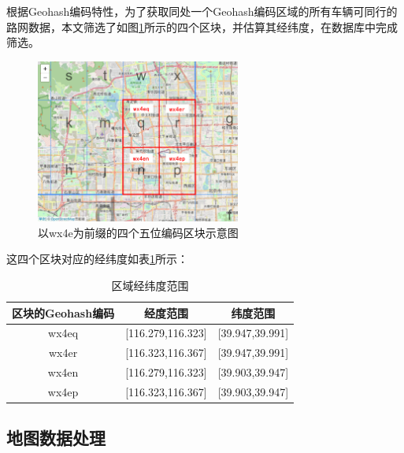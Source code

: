 根据Geohash编码特性，为了获取同处一个Geohash编码区域的所有车辆可同行的路网数据，本文筛选了如图\ref{mapDataRegion-big}所示的四个区块，并估算其经纬度，在数据库中完成筛选。

\begin{figure}[ht]
    \centering
    \includegraphics[width=0.6\textwidth]{undergraduate-thesis/images/FourRegions.png}
    \caption{以wx4e为前缀的四个五位编码区块示意图}
    \label{mapDataRegion-big}
\end{figure}

这四个区块对应的经纬度如表\ref{mapDataRegion-number}所示：

\begin{table}[ht]
    \linespread{1.5}
    \centering
    \caption{区域经纬度范围}
    \label{mapDataRegion-number}
    \begin{tabular}{ccc}
    \toprule
    区块的Geohash编码 & 经度范围 & 纬度范围 \\
    \midrule
    wx4eq & [116.279,116.323] & [39.947,39.991]\\
    wx4er & [116.323,116.367] & [39.947,39.991]\\
    wx4en & [116.279,116.323] & [39.903,39.947]\\
    wx4ep & [116.323,116.367] & [39.903,39.947]\\
    \bottomrule
    \end{tabular}
\end{table}

\subsection{地图数据处理}

